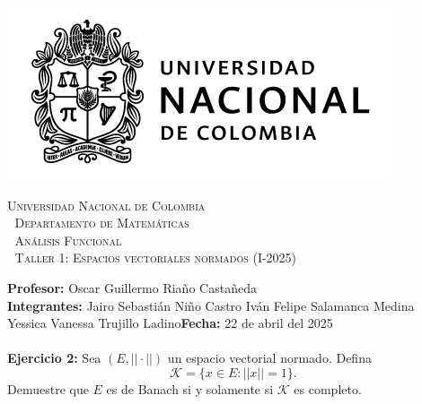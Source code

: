 \thispagestyle{empty}

\begin{minipage}{0.3\textwidth}
  \includegraphics[scale=0.35]{logounal.png}
\end{minipage}%
\hfill
\begin{minipage}{0.65\textwidth}
  \begin{center}
    \scshape
    \Large \textsc{Universidad Nacional de Colombia} \\
    \textcolor{white}{\tiny.} \Large \textsc{Departamento de Matemáticas} \\
    \textcolor{white}{\tiny.} \large \textsc{Análisis Funcional} \\
    \textcolor{white}{\tiny.} \large \textsf{Taller 1: Espacios vectoriales normados} \normalsize (I-2025)
  \end{center}
\end{minipage}

\vspace{0.3cm}
\normalfont

\textbf{Profesor:} Oscar Guillermo Riaño Castañeda\\
\textbf{Integrantes:} Jairo Sebastián Niño Castro\hspace{2.8cm}
Iván Felipe Salamanca Medina\\
\hspace*{2.1cm} Yessica Vanessa Trujillo Ladino\hspace{2.25cm}\textbf{Fecha:} 22 de abril del 2025\\
\vspace{0.25cm}\\
\textbf{Ejercicio 2:} Sea $(E,||\cdot ||)$ un espacio vectorial normado. Defina
$$\mathcal{K}= \{x\in E: ||x||=1\}.$$
Demuestre que $E$ es de Banach si y solamente si $\mathcal{K}$ es completo.\\

